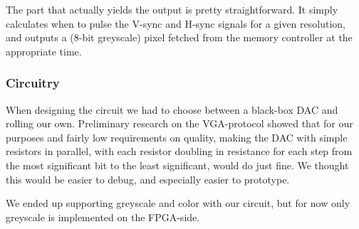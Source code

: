  
The part that actually yields the output is pretty straightforward. It simply
calculates when to pulse the V-sync and H-sync signals for a given resolution,
and outputs a (8-bit greyscale) pixel fetched from the memory controller at the
appropriate time.

\subsubsection{Circuitry}
When designing the circuit we had to choose between a black-box DAC and rolling our own. Preliminary research on the
VGA-protocol showed that for our purposes and fairly low requirements on
quality, making the DAC with simple resistors in parallel, with each resistor
doubling in resistance for each step from the most significant bit to the least
significant, would do just fine. We thought this would be easier to debug, and
especially easier to prototype.

We ended up supporting greyscale and color with our circuit, but for now only
greyscale is implemented on the FPGA-side.
